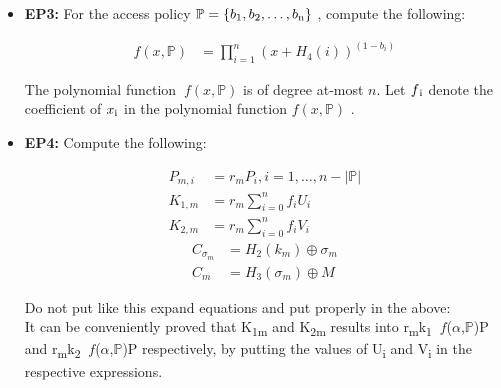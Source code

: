 \documentclass[conference]{IEEEtran}
\begin{document}
{\begin{itemize}
    \item{\textbf {EP3:}} For the access policy $\mathbb{P} = \{b\textsubscript{1}, b\textsubscript{2}, \ldots, b\textsubscript{n}\}$ , compute the following:

          \begin{ceqn}
              \begin{align}
                  f(x,\mathbb{P} ) & = \prod_{i=1}^n(x+H_4(i))^{(1-b_i)}
              \end{align}
          \end{ceqn}

          The polynomial function $\ f(x, \mathbb{P} )$ is of degree at-most $n$. Let $f\textsubscript{i}$ denote the coefficient of $x\textsubscript{i}$ in the polynomial function $f(x,\mathbb{P} )$ .

    \item{\textbf {EP4:}} Compute the following:
          \begin{ceqn}
              \begin{align}
                  P_{m,i} & = r_m P_i , i = 1, \ldots, n - |\mathbb{P} | \\
                  K_{1,m} & = r_m \sum_{i=0}^n f_i U_i                   \\
                  K_{2,m} & = r_m \sum_{i=0}^n f_i V_i
              \end{align}
              \begin{align}
                  C_{\sigma_m} & = H_2(k_m) \oplus \sigma_m \\
                  C_m          & = H_3(\sigma_m) \oplus M
              \end{align}
          \end{ceqn}


          {\color{red} Do not put like this expand equations and put properly in the above:}\\

          It can be conveniently proved that K\textsubscript{1m} and K\textsubscript{2m} results into r\textsubscript{m}k\textsubscript{1} $\ f$($\alpha$,$\mathbb{P}$)P and r\textsubscript{m}k\textsubscript{2} $\ f$($\alpha$,$\mathbb{P}$)P respectively, by putting the values of U\textsubscript{i} and V\textsubscript{i} in the respective expressions.\\





\end{itemize}}
\end{document}
